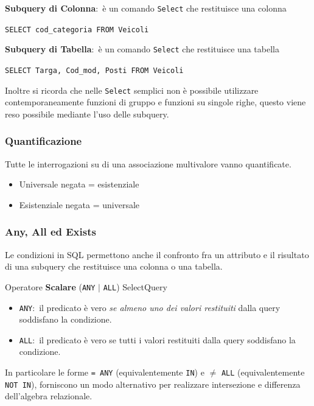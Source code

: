 \noindent \textbf{Subquery di Colonna}:\ è un comando \texttt{Select} che restituisce una colonna
\begin{flushleft}
	\texttt{SELECT cod\_categoria FROM Veicoli}
\end{flushleft}

\noindent \textbf{Subquery di Tabella}:\ è un comando \texttt{Select} che restituisce una tabella
\begin{flushleft}
	\texttt{SELECT Targa, Cod\_mod, Posti FROM Veicoli}
\end{flushleft}

\noindent Inoltre si ricorda che nelle \texttt{Select} semplici non è possibile utilizzare contemporaneamente funzioni di gruppo e funzioni su singole righe, questo viene reso possibile mediante l'uso delle subquery.

\subsubsection{Quantificazione}

Tutte le interrogazioni su di una associazione multivalore vanno quantificate.
\begin{itemize}
	\item Universale negata = esistenziale
	\item Esistenziale negata = universale
\end{itemize}

\subsubsection{Any, All ed Exists}

Le condizioni in SQL permettono anche il confronto fra un attributo e il risultato di una subquery che restituisce una colonna o una tabella.

\noindent Operatore \textbf{Scalare} (\texttt{ANY} $|$ \texttt{ALL}) SelectQuery
\begin{itemize}
	\item \texttt{ANY}:\ il predicato è vero \textit{se almeno uno dei valori restituiti} dalla query soddisfano la condizione.
	\item \texttt{ALL}:\ il predicato è vero se tutti i valori restituiti dalla query soddisfano la condizione.
\end{itemize}
In particolare le forme \texttt{= ANY} (equivalentemente \texttt{IN}) e $\neq$ \texttt{ALL} (equivalentemente \texttt{NOT IN}), forniscono un modo alternativo per realizzare intersezione e differenza dell'algebra relazionale.\

